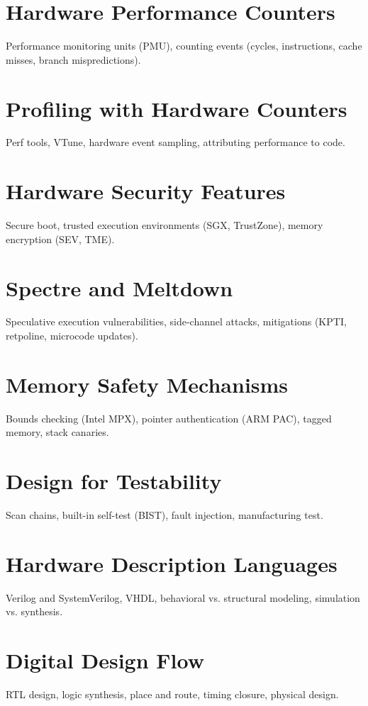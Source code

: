 \chapter{Hardware Performance Counters}
Performance monitoring units (PMU), counting events (cycles, instructions, cache misses, branch mispredictions).

\chapter{Profiling with Hardware Counters}
Perf tools, VTune, hardware event sampling, attributing performance to code.

\chapter{Hardware Security Features}
Secure boot, trusted execution environments (SGX, TrustZone), memory encryption (SEV, TME).

\chapter{Spectre and Meltdown}
Speculative execution vulnerabilities, side-channel attacks, mitigations (KPTI, retpoline, microcode updates).

\chapter{Memory Safety Mechanisms}
Bounds checking (Intel MPX), pointer authentication (ARM PAC), tagged memory, stack canaries.

\chapter{Design for Testability}
Scan chains, built-in self-test (BIST), fault injection, manufacturing test.

\chapter{Hardware Description Languages}
Verilog and SystemVerilog, VHDL, behavioral vs. structural modeling, simulation vs. synthesis.

\chapter{Digital Design Flow}
RTL design, logic synthesis, place and route, timing closure, physical design.

